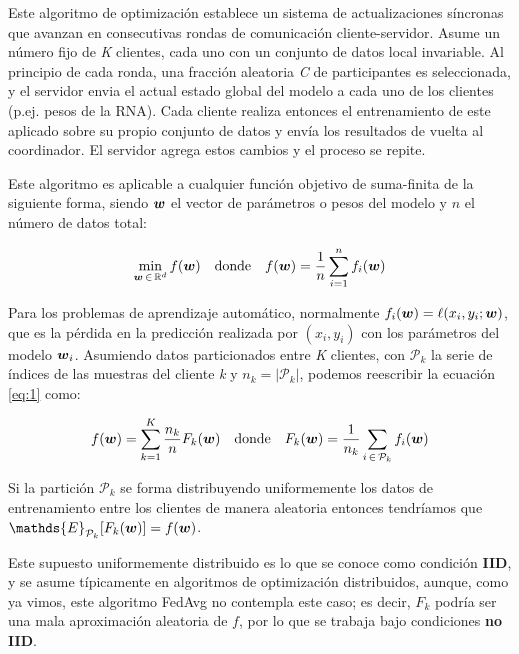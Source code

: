\documentclass[00-Trabajo_Final.tex]{subfiles}
\begin{document}
Este algoritmo de optimización establece un sistema de actualizaciones síncronas que avanzan en consecutivas rondas de comunicación cliente-servidor. Asume un número fijo de \textit{K} clientes, cada uno con un conjunto de datos local invariable. Al principio de cada ronda, una fracción aleatoria \textit{C} de participantes es seleccionada, y el servidor envia el actual estado global del modelo a cada uno de los clientes (p.ej. pesos de la RNA). Cada cliente realiza entonces el entrenamiento de este aplicado sobre su propio conjunto de datos y envía los resultados de vuelta al coordinador. El servidor agrega estos cambios y el proceso se repite.

\vspace{1em}

Este algoritmo es aplicable a cualquier función objetivo de suma-finita de la siguiente forma, siendo $\boldsymbol{w}$ el vector de parámetros o pesos del modelo y $n$ el número de datos total:

\begin{equation}
\label{eq:1}
\min_{\boldsymbol{w}\,\in\,\mathbb{R}^{d}} f(\boldsymbol{w}) \quad \text{donde} \quad f(\boldsymbol{w}) = \frac{1}{n} \sum_{i=1}^{n}f_i(\boldsymbol{w}) 
\end{equation}

Para los problemas de aprendizaje automático, normalmente $f_i(\boldsymbol{w}) = \ell(x_i, y_i; \boldsymbol{w})$, que es la pérdida en la predicción realizada por $(x_i, y_i)$ con los parámetros del modelo $\boldsymbol{w}_i$. Asumiendo datos particionados entre \textit{K} clientes, con $\mathcal{P}_k$ la serie de índices de las muestras del cliente \textit{k} y $n_k = |\mathcal{P}_k|$, podemos reescribir la ecuación \eqref{eq:1} como:

\begin{equation}
\label{eq:2}
f(\boldsymbol{w}) = \sum_{k=1}^{K}\frac{n_k}{n}F_k(\boldsymbol{w}) \quad \text{donde} \quad F_k(\boldsymbol{w}) = \frac{1}{n_k} \sum_{i\,\in\,\mathcal{P}_k} f_i(\boldsymbol{w})
\end{equation}

Si la partición $\mathcal{P}_k$ se forma distribuyendo uniformemente los datos de entrenamiento entre los clientes de manera aleatoria entonces tendríamos que $\mathds{E}_{\mathcal{P}_k} [F_k(\bsym{w})] = f(\bsym{w})$.

\vspace{1em}

Este supuesto uniformemente distribuido es lo que se conoce como condición \textbf{IID}, y se asume típicamente en algoritmos de optimización distribuidos, aunque, como ya vimos, este algoritmo FedAvg no contempla este caso; es decir, $F_k$ podría ser una mala aproximación aleatoria de $f$, por lo que se trabaja bajo condiciones \textbf{no IID}.
\end{document}
